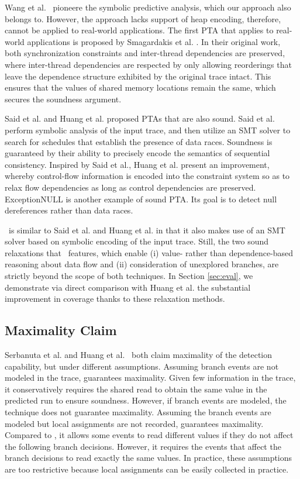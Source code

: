 Wang et al.~\cite{chao} pioneere the symbolic predictive analysis, 
which our approach also belongs to. However, the approach lacks support 
of heap encoding, therefore, cannot be applied to real-world applications. 
The first PTA that applies to real-world applications is proposed by 
Smagardakis et al. \cite{yannis}. In their original work, both synchronization 
constraints and inter-thread dependencies are preserved, where inter-thread 
dependencies are respected by only allowing reorderings that leave the 
dependence structure exhibited by the original trace intact. This ensures 
that the values of shared memory locations remain the same, which secures 
the soundness argument.

Said et al. \cite{Said:2011} and Huang et al. \cite{HuangMR14} proposed
PTAs that are also sound. Said et al. perform symbolic analysis of the 
input trace, and then utilize an SMT solver to search for schedules that 
establish the presence of data races. Soundness is guaranteed by their 
ability to precisely encode the semantics of sequential consistency. 
Inspired by Said et al., Huang et al. present an improvement, whereby 
control-flow information is encoded into the constraint system so as 
to relax flow dependencies as long as control dependencies are 
preserved. ExceptionNULL \cite{Farzan:2012} is another example of 
sound PTA. Its goal is to detect null dereferences rather than data races. 

\tool\ is similar to Said et al. and Huang et al. in that it also makes 
use of an SMT solver based on symbolic encoding of the input 
trace. Still, the two sound relaxations that \tool\ features, which 
enable (i) value- rather than dependence-based reasoning about data 
flow and (ii) consideration of unexplored branches, are strictly beyond
the scope of both techniques. In Section \ref{sec:eval}, we demonstrate 
via direct comparison with Huang et al. the substantial improvement 
in coverage thanks to these relaxation methods.

\subsection{Maximality Claim}
Serbanuta et al. \cite{maximal} and Huang et al.~\cite{HuangMR14} both 
claim maximality of the detection capability, but under different assumptions. 
Assuming branch events are not modeled in the trace, \cite{maximal} guarantees maximality. Given few 
information in the trace, it conservatively requires the shared read to 
obtain the same value in the predicted run to ensure soundness. However, if 
branch events are modeled, the technique does not guarantee maximality.  
Assuming the branch events are modeled but local assignments are not recorded, 
\cite{HuangMR14} guarantees maximality. 
Compared to \cite{maximal}, it allows some events to read different 
values if they do not affect the following branch decisions. However, 
it requires the events that affect the branch decisions to read exactly 
the same values. In practice, these assumptions are too restrictive  
because local assignments can be easily collected in practice.

